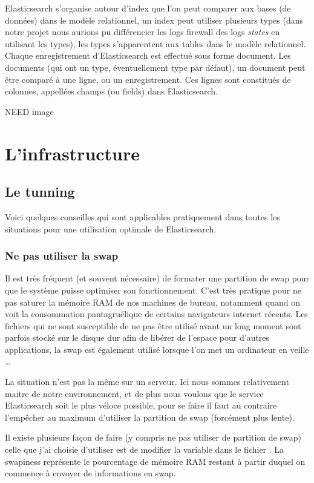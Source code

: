 Elasticsearch s'organise autour d'index que l'on peut comparer aux bases (de données)
dans le modèle relationnel, un index peut utiliser plusieurs types (dans notre projet
nous aurions pu différencier les logs firewall des logs \textit{states} en utilisant 
les types), les types s'apparentent aux tables dans le modèle relationnel. 
Chaque enregistrement d'Elasticsearch est effectué sous forme document. Les documents
(qui ont un type, éventuellement type par défaut), un document peut être comparé 
à une ligne, ou un enregistrement. Ces lignes sont constitués de colonnes, appellées
champs (ou fields) dans Elasticsearch.


{\Huge NEED image}


\section{L'infrastructure}

\subsection{Le tunning}
Voici quelques conseilles qui sont applicables pratiquement dans toutes les situations
pour une utilisation optimale de Elasticsearch.

\subsubsection{Ne pas utiliser la swap}
Il est très fréquent (et souvent nécessaire) de formater une partition de swap pour
que le système puisse optimiser son fonctionnement. C'est très pratique pour ne pas
saturer la mémoire RAM de nos machines de bureau, notamment quand on voit la consommation
pantagruélique de certains navigateurs internet récents. Les fichiers qui ne sont 
susceptible de ne pas être utilisé avant un long moment sont parfois stocké sur le
disque dur afin de libérer de l'espace pour d'autres applications, la swap est
également utilisé lorsque l'on met un ordinateur en veille \ldots

La situation n'est pas la même sur un serveur. Ici nous sommes relativement maitre
de notre environnement, et de plus nous voulons que le service Elasticsearch soit 
le plus véloce possible, pour se faire il faut au contraire l'empêcher au maximum 
d'utiliser la partition de swap (forcément plus lente).

Il existe plusieurs façon de faire (y compris ne pas utiliser de partition de swap)
celle que j'ai choisie d'utiliser est de modifier la variable 
dans le fichier . La swapiness représente le pourcentage
de mémoire RAM restant à partir duquel on commence à envoyer de informations en
swap.

